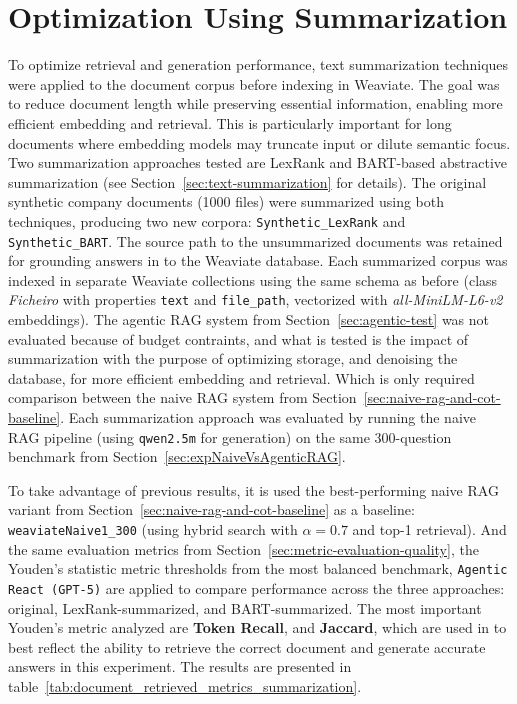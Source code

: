 \section{Optimization Using Summarization}
To optimize retrieval and generation performance, text summarization techniques were applied to the document corpus before indexing in Weaviate. The goal was to reduce document length while preserving essential information, enabling more efficient embedding and retrieval.
This is particularly important for long documents where embedding models may truncate input or dilute semantic focus.
Two summarization approaches tested are LexRank and BART-based abstractive summarization (see Section~\ref{sec:text-summarization} for details).
The original synthetic company documents (1000 files) were summarized using both techniques, producing two new corpora: \texttt{Synthetic\_LexRank} and \texttt{Synthetic\_BART}. The source path to the unsummarized documents was retained for grounding answers in to the Weaviate database.
Each summarized corpus was indexed in separate Weaviate collections using the same schema as before (class \textit{Ficheiro} with properties \texttt{text} and \texttt{file\_path}, vectorized with \textit{all-MiniLM-L6-v2} embeddings). The agentic RAG system from Section~\ref{sec:agentic-test} was not evaluated because of budget contraints, and what is tested is the impact of summarization with the purpose of optimizing storage, and denoising the database, for more efficient embedding and retrieval. Which is only required comparison between the naive RAG system from Section~\ref{sec:naive-rag-and-cot-baseline}.
Each summarization approach was evaluated by running the naive RAG pipeline (using \texttt{qwen2.5m} for generation) on the same 300-question benchmark from Section~\ref{sec:expNaiveVsAgenticRAG}. 

To take advantage of previous results, it is used the best-performing naive RAG variant from Section~\ref{sec:naive-rag-and-cot-baseline} as a baseline: \texttt{weaviateNaive1\_300} (using hybrid search with \(\alpha=0.7\) and top-1 retrieval). And the same evaluation metrics from Section~\ref{sec:metric-evaluation-quality}, the Youden's statistic metric thresholds from the most balanced benchmark, \texttt{Agentic React (\gls{GPT}-5)} are applied to compare performance across the three approaches: original, LexRank-summarized, and BART-summarized. The most important Youden's metric analyzed are \textbf{Token Recall}, and \textbf{Jaccard}, which are used in to best reflect the ability to retrieve the correct document and generate accurate answers in this experiment.
The results are presented in table~\ref{tab:document_retrieved_metrics_summarization}.


